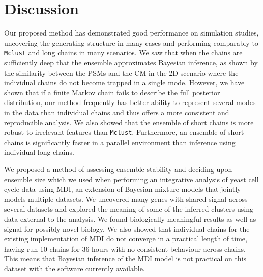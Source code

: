 \documentclass{bmcart}
\begin{document}

\section*{Discussion}
Our proposed method has demonstrated good performance on simulation studies, uncovering the generating structure in many cases and performing comparably to \texttt{Mclust} and long chains in many scenarios. We saw that when the chains are sufficiently deep that the ensemble approximates Bayesian inference, as shown by the similarity between the PSMs and the CM in the 2D scenario where the individual chains do not become trapped in a single mode. However, we have shown that if a finite Markov chain fails to describe the full posterior distribution, our method frequently has better ability to represent several modes in the data than individual chains and thus offers a more consistent and reproducible analysis. We also showed that the ensemble of short chains is more robust to irrelevant features than \texttt{Mclust}. Furthermore, an ensemble of short chains is significantly faster in a parallel environment than inference using individual long chains. 

We proposed a method of assessing ensemble stability and deciding upon ensemble size which we used when performing an integrative analysis of yeast cell cycle data using MDI, an extension of Bayesian mixture models that jointly models multiple datasets. 
We uncovered many genes with shared signal across several datasets and explored the meaning of some of the inferred clusters using data external to the analysis. We found biologically meaningful results as well as signal for possibly novel biology. We also showed that individual chains for the existing implementation of MDI do not converge in a practical length of time, having run 10 chains for 36 hours with no consistent behaviour across chains. This means that Bayesian inference of the MDI model is not practical on this dataset with the software currently available.
\end{document}
